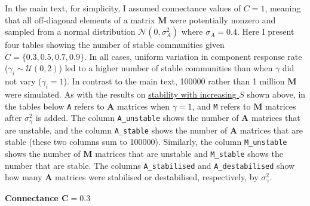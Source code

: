 \documentclass[]{article}
\begin{document}
In the main text, for simplicity, I assumed connectance values of
\(C = 1\), meaning that all off-diagonal elements of a matrix
\(\mathbf{M}\) were potentially nonzero and sampled from a normal
distribution \(\mathcal{N}(0, \sigma^{2}_{A})\) where
\(\sigma_{A} = 0.4\). Here I present four tables showing the number of
stable communities given \(C = \{0.3, 0. 5, 0.7, 0.9 \}\). In all cases,
uniform variation in component response rate
(\(\gamma_{i} \sim \mathcal{U}(0, 2)\)) led to a higher number of stable
communities than when \(\gamma\) did not vary (\(\gamma_{i} = 1\)). In
contrast to the main text, 100000 rather than 1 million \(\mathbf{M}\)
were simulated. As with the results on
\protect\hyperlink{IncrS}{stability with increasing \(S\)} shown above,
in the tables below \texttt{A} refers to \(\mathbf{A}\) matrices when
\(\gamma = 1\), and \texttt{M} refers to \(\mathbf{M}\) matrices after
\(\sigma^{2}_{\gamma}\) is added. The column \texttt{A\_unstable} shows
the number of \(\mathbf{A}\) matrices that are unstable, and the column
\texttt{A\_stable} shows the number of \(\mathbf{A}\) matrices that are
stable (these two columns sum to 100000). Similarly, the column
\texttt{M\_unstable} shows the number of \(\mathbf{M}\) matrices that
are unstable and \texttt{M\_stable} shows the number that are stable.
The columns \texttt{A\_stabilised} and \texttt{A\_destabilised} show how
many \(\mathbf{A}\) matrices were stabilised or destabilised,
respectively, by \(\sigma^{2}_{\gamma}\).

\textbf{Connectance \(\mathbf{C = 0.3}\)}
\end{document}

